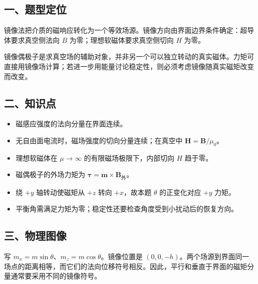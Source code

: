 \documentclass[12pt,a4paper,fontset=fandol]{ctexart}
\providecommand{\tightlist}{\setlength{\itemsep}{0pt}\setlength{\parskip}{0pt}}
\begin{document}
\subsection{一、题型定位}\label{ux4e00ux9898ux578bux5b9aux4f4d-2}

镜像法把介质的磁响应转化为一个等效场源。镜像方向由界面边界条件确定：超导体要求真空侧法向
\(B\) 为零；理想软磁体要求真空侧切向 \(H\) 为零。

镜像偶极子是求真空场的辅助对象，并非另一个可以独立转动的真实磁体。力矩可直接用镜像场计算；若进一步用能量讨论稳定性，则必须考虑镜像随真实磁矩改变而改变。

\subsection{二、知识点}\label{ux4e8cux77e5ux8bc6ux70b9-2}

\begin{itemize}
\tightlist
\item
  磁感应强度的法向分量在界面连续。
\item
  无自由面电流时，磁场强度的切向分量连续；在真空中
  \(\boldsymbol H=\boldsymbol B/\mu_0\)。
\item
  理想软磁体在 \(\mu\to\infty\) 的有限磁场极限下，内部切向 \(H\)
  趋于零。
\item
  磁偶极子的外场力矩为
  \(\boldsymbol\tau=\boldsymbol m\times\boldsymbol B_{\text{外}}\)。
\item
  绕 \(+y\) 轴转动使磁矩从 \(+z\) 转向 \(+x\)，故本题 \(\theta\)
  的正变化对应 \(+y\) 力矩。
\item
  平衡角需满足力矩为零；稳定性还要检查角度受到小扰动后的恢复方向。
\end{itemize}

\subsection{三、物理图像}\label{ux4e09ux7269ux7406ux56feux50cf-2}

写 \(m_x=m\sin\theta\)、\(m_z=m\cos\theta\)。镜像位置是
\((0,0,-h)\)。两个场源到界面同一场点的距离相等，而它们的法向位移符号相反。因此，平行和垂直于界面的磁矩分量通常要采用不同的镜像符号。
\end{document}

